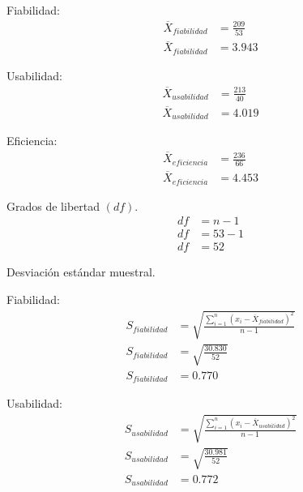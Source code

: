 Fiabilidad:
\begin{equation*}
  \begin{split}
    \overline{X}_{fiabilidad} & = \frac{209}{53} \\
    \overline{X}_{fiabilidad} & = 3.943
  \end{split}
\end{equation*}

Usabilidad:
\begin{equation*}
  \begin{split}
    \overline{X}_{usabilidad} & = \frac{213}{40} \\
    \overline{X}_{usabilidad} & = 4.019
  \end{split}
\end{equation*}

Eficiencia:
\begin{equation*}
  \begin{split}
    \overline{X}_{eficiencia} & = \frac{236}{66} \\
    \overline{X}_{eficiencia} & = 4.453
  \end{split}
\end{equation*}

Grados de libertad $(df)$.
\begin{equation*}
  \begin{split}
    df & = n - 1 \\
    df & = 53 - 1 \\
    df & = 52
  \end{split}
\end{equation*}

Desviación estándar muestral.

Fiabilidad:
\begin{equation*}
  \begin{split}
    S_{fiabilidad} & = \sqrt{\frac{\sum_{i=1}^{n} (x_{i} - \overline{X}_{fiabilidad})^2}{n - 1}} \\
    S_{fiabilidad} & = \sqrt{\frac{30.830}{52}} \\
    S_{fiabilidad} & = 0.770
  \end{split}
\end{equation*}

Usabilidad:
\begin{equation*}
  \begin{split}
    S_{usabilidad} & = \sqrt{\frac{\sum_{i=1}^{n} (x_{i} - \overline{X}_{usabilidad})^2}{n - 1}} \\
    S_{usabilidad} & = \sqrt{\frac{30.981}{52}} \\
    S_{usabilidad} & = 0.772
  \end{split}
\end{equation*}

